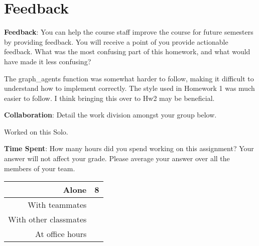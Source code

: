 \documentclass[12pt]{article}
\begin{document}
\clearpage
\section*{Feedback}

\textbf{Feedback}: You can help the course staff improve the course for future semesters by providing feedback. You will receive a point of you provide actionable feedback. What was the most confusing part of this homework, and what would have made it less confusing?
\begin{solution}[height=4cm]

The graph\_agents function was somewhat harder to follow, making it difficult to understand how to implement correctly. The style used in Homework 1 was much easier to follow. I think bringing this over to Hw2 may be beneficial.

\end{solution}

\textbf{Collaboration}: Detail the work division amongst your group below.
\begin{solution}[height=4cm]
Worked on this Solo.
\end{solution}

\noindent\textbf{Time Spent}: How many hours did you spend working on this assignment? Your answer will not affect your grade. Please average your answer over all the members of your team.
\begin{solution}[height=4cm]
\begin{table}[H]
    \centering
    \begin{tabular}{r|c}
        Alone &  \hspace{3em} 8 %
        \\ \hline
        With teammates & \hspace{3em} %
        \\ \hline
        With other classmates & \hspace{3em} %
        \\ \hline
        At office hours & \hspace{3em} %
        \\ \hline
    \end{tabular}
\end{table}
\end{solution}
\end{document}
